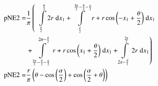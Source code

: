 \begin{align}
    \mathrm{pNE2} =&\frac{1}{\pi} \left(\;\;\int\limits_{\frac{\pi}{2}}^{\frac{\theta}{2}}2 r\;\mathrm{d}x_{1}+\int\limits_{\frac{\theta}{2}}^{\frac{5 \pi}{2} - \frac{\theta}{2} - \frac{\alpha}{2}}r + r \cos{\left (- x_{1} + \frac{\theta}{2} \right )}\;\mathrm{d}x_{1}\right.\notag\\
 &\left.+\int\limits_{\frac{5 \pi}{2} - \frac{\theta}{2} - \frac{\alpha}{2}}^{2 \pi - \frac{\theta}{2}}r + r \cos{\left (x_{1} + \frac{\theta}{2} \right )}\;\mathrm{d}x_{1}+\int\limits_{2 \pi - \frac{\theta}{2}}^{\frac{3 \pi}{2}}2 r\;\mathrm{d}x_{1}\right)\label{pNE2Def}\\
    \mathrm{pNE2} =& \frac{r}{\pi} \left(\theta - \cos{\left (\frac{\alpha}{2} \right )} + \cos{\left (\frac{\alpha}{2} + \theta \right )}\right)\label{pNE2Sln}
\end{align}